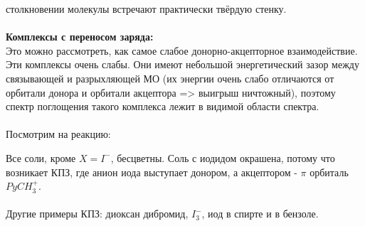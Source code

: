столкновении молекулы встречают практически твёрдую стенку. \\ \\
\textbf{Комплексы с переносом заряда:} \\
Это можно рассмотреть, как самое слабое донорно-акцепторное
взаимодействие. Эти комплексы очень слабы. Они имеют
небольшой энергетический зазор между связывающей и
разрыхляющей МО (их энергии очень слабо отличаются от
орбитали донора и орбитали акцептора => выигрыш ничтожный),
поэтому спектр поглощения такого комплекса лежит в видимой
области спектра. \\ \\
Посмотрим на реакцию:
\begin{figure} [H]
	\centering {\texttt{[image: rr8]}}
\end{figure}
Все соли, кроме $X=I^-$, бесцветны. Соль с иодидом окрашена, потому
что возникает КПЗ, где анион иода выступает донором, а
акцептором - $\pi$ орбиталь $PyCH_3^+$. \\ \\
Другие примеры КПЗ: диоксан дибромид, $I_3^-$, иод в спирте и в
бензоле.

